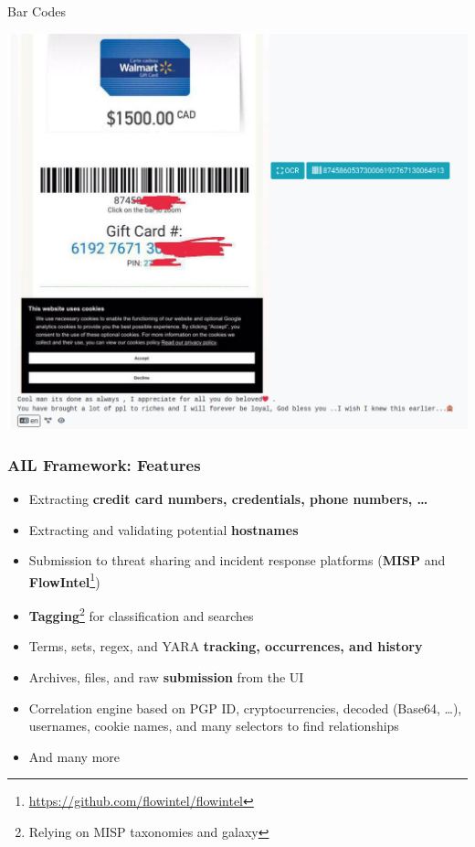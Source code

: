 \documentclass[10pt,aspectratio=169, colorlinks=true, linkcolor=circlBlue]{beamer}
\begin{document}
\begin{frame}[fragile]{Bar Codes}
    \begin{center}
        \includegraphics[scale=0.22]{screenshot/barcode.png}
    \end{center}
\end{frame}

\begin{frame}
    \frametitle{AIL Framework: Features}
    \begin{itemize}
        \item Extracting \textbf{credit card numbers, credentials, phone numbers, \dots}
        \item Extracting and validating potential \textbf{hostnames}
        \item Submission to threat sharing and incident response platforms (\textbf{MISP} and \textbf{FlowIntel}\footnote{\url{https://github.com/flowintel/flowintel}})
        \item \textbf{Tagging}\footnote{Relying on MISP taxonomies and galaxy} for classification and searches
        \item Terms, sets, regex, and YARA \textbf{tracking, occurrences, and history}
        \item Archives, files, and raw \textbf{submission} from the UI
        \item Correlation engine based on PGP ID, cryptocurrencies, decoded (Base64, \dots), usernames, cookie names, and many selectors to find relationships
        \item And many more
    \end{itemize}
\end{frame}
\end{document}
